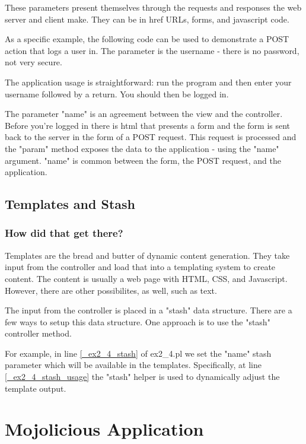 \documentclass[17pt]{extreport}
\newcommand\Small{\fontsize{10}{10.2}\selectfont}
\newcommand*\LSTfont{\Small\ttfamily\SetTracking{encoding=*}{-60}\lsstyle}
\begin{document}
These parameters present themselves through the requests and
responses the web server and client make.  They can be in href URLs, forms, and
javascript code.

As a specific example, the following code can be used to
demonstrate a POST action that logs a user in.  The parameter is the username -
there is no password, not very secure.



The application usage is straightforward: run the program and then enter your
username followed by a return.  You should then be logged in.

The parameter "name" is an agreement between the view and the controller.
Before you're logged in there is html that presents a form and the form is sent
back to the server in the form of a POST request.  This request is processed
and the "param" method exposes the data to the application - using the "name"
argument.  "name" is common between the form, the POST request, and the
application.

\section{Templates and Stash}

\subsection{How did that get there?}

Templates are the bread and butter of dynamic content generation.  They take
input from the controller and load that into a templating system to create
content.  The content is usually a web page with HTML, CSS, and Javascript.
However, there are other possibilites, as well, such as text.

The input from the controller is placed in a "stash" data structure.  There are
a few ways to setup this data structure.  One approach is to use the "stash"
controller method.



For example, in line \ref{_ex2_4_stash} of ex2\_4.pl we set the "name" stash 
parameter which will be available in the templates.  Specifically, at line 
\ref{_ex2_4_stash_usage} the "stash" helper is used to dynamically adjust
the template output.

\chapter*{Mojolicious Application}
\end{document}
